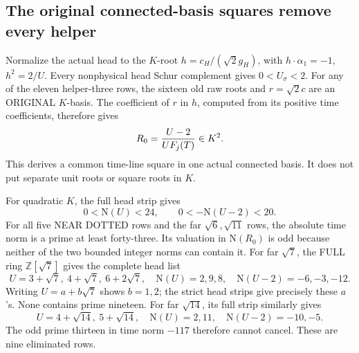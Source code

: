 \documentclass[11pt]{article}
\begin{document}
\subsection{The original connected-basis squares remove every helper}
\label{app:arithB16helpersquares}

Normalize the actual head to the \(K\)-root
\(h=c_H/(\sqrt2g_H)\), with
\(h\cdot\alpha_1=-1\), \(h^2=2/U\).
Every nonphysical head Schur complement gives
\(0<U_\sigma<2\).
For any of the eleven helper-three rows, the
sixteen old raw roots and \(r=\sqrt2c\) are an
ORIGINAL \(K\)-basis.
The coefficient of \(r\) in \(h\), computed from
its positive time coefficients, therefore gives
\[
                      R_0={U-2\over U F_j(T)}\in K^2 .
\]
This derives a common time-line square in one
actual connected basis.  It does not put separate
unit roots or square roots in \(K\).

For quadratic \(K\), the full head strip gives
\[
                     0<\mathrm N(U)<24,\qquad
                     0<-\mathrm N(U-2)<20.
\]
For all five NEAR DOTTED rows and the far
\(\sqrt6,\sqrt{11}\) rows, the absolute time
norm is a prime at least forty-three.
Its valuation in \(\mathrm N(R_0)\) is odd
because neither of the two bounded integer norms
can contain it.
For far \(\sqrt7\), the FULL ring
\(\mathbb Z[\sqrt7]\) gives the complete head list
\[
 U=3+\sqrt7,\ 4+\sqrt7,\ 6+2\sqrt7,
\quad \mathrm N(U)=2,9,8,\quad
 \mathrm N(U-2)=-6,-3,-12 .
\]
Writing \(U=a+b\sqrt7\) shows \(b=1,2\);
the strict head strips give precisely these \(a\)'s.
None contains prime nineteen.
For far \(\sqrt{14}\), its full strip similarly
gives
\[
 U=4+\sqrt{14},\ 5+\sqrt{14},\quad
 \mathrm N(U)=2,11,\quad\mathrm N(U-2)=-10,-5 .
\]
The odd prime thirteen in time norm \(-117\)
therefore cannot cancel.
These are nine eliminated rows.
\end{document}
